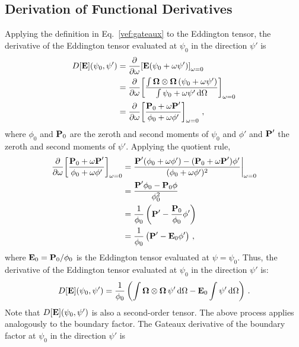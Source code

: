 \documentclass[../doc.tex]{subfiles}
\begin{document}
\subsection{Derivation of Functional Derivatives}
Applying the definition in Eq.~\ref{vef:gateaux} to the Eddington tensor, the derivative of the Eddington tensor evaluated at $\psi_0$ in the direction $\psi'$ is 
	\begin{equation}
	\begin{aligned}
		D[\E](\psi_0,\psi') &= \pderiv{}{\omega} \bracket{\E(\psi_0 + \omega\psi')}_{\omega=0} \\
		&= \pderiv{}{\omega}\bracket{\frac{\int \Omegahat\otimes\Omegahat\paren{\psi_0 + \omega\psi'}}{\int \psi_0 + \omega \psi' \ud \Omega}}_{\omega=0} \\
		&= \pderiv{}{\omega}\bracket{\frac{\P_0 + \omega\P'}{\phi_0 + \omega\phi'}}_{\omega=0} \,,
	\end{aligned}
	\end{equation}
where $\phi_0$ and $\P_0$ are the zeroth and second moments of $\psi_0$ and $\phi'$ and $\P'$ the zeroth and second moments of $\psi'$. Applying the quotient rule, 
	\begin{equation}
	\begin{aligned}
		\pderiv{}{\omega}\bracket{\frac{\P_0 + \omega\P'}{\phi_0 + \omega\phi'}}_{\omega=0} &= \frac{\P'(\phi_0 + \omega \phi') - (\P_0 + \omega\P')\phi'}{(\phi_0 + \omega\phi')^2} \biggr\rvert_{\omega=0} \\
		&= \frac{\P' \phi_0 - \P_0 \phi}{\phi_0^2} \\
		&= \frac{1}{\phi_0}\paren{\P' - \frac{\P_0}{\phi_0} \phi'} \\
		&= \frac{1}{\phi_0}\paren{\P' - \E_0 \phi'} \,, 
	\end{aligned}
	\end{equation}
where $\E_0 = \P_0/\phi_0$ is the Eddington tensor evaluated at $\psi = \psi_0$. 
Thus, the derivative of the Eddington tensor evaluated at $\psi_0$ in the direction $\psi'$ is: 
	\begin{equation} \label{vef:Edd_deriv}
		D[\E](\psi_0,\psi') = \frac{1}{\phi_0} \paren{\int \Omegahat\otimes\Omegahat\,\psi'\ud\Omega - \E_0\int \psi' \ud \Omega} \,. 
	\end{equation}
Note that $D[\E](\psi_0,\psi')$ is also a second-order tensor. The above process applies analogously to the boundary factor. 
The Gateaux derivative of the boundary factor at $\psi_0$ in the direction $\psi'$ is 
\end{document}
